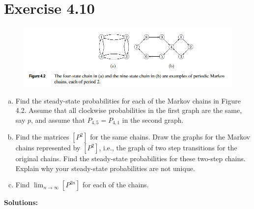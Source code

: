 \documentclass{article}
\begin{document}
    \section{Exercise 4.10}
    \begin{figure}[h]
        \centering
        \includegraphics[width=5.5in]{figure_4_2.png}
    \end{figure}
    \begin{enumerate}[(a)]
        \item Find the steady-state probabilities for each of the Markov chains in Figure 4.2. Assume that all clockwise probabilities in the first graph are the same, say $p$, and assume that $P_{4,5}=P_{4,1}$ in the second graph.
        \item Find the matrices $[P^2]$ for the same chains. Draw the graphs for the Markov chains represented by $[P^2]$, i.e., the graph of two step transitions for the original chains. Find the steady-state probabilities for these two-step chains. Explain why your steady-state probabilities are not unique.
        \item Find $\lim_{n\rightarrow\infty}[P^{2n}]$ for each of the chains.
    \end{enumerate}
    \textbf{Solutions:}
\end{document}
